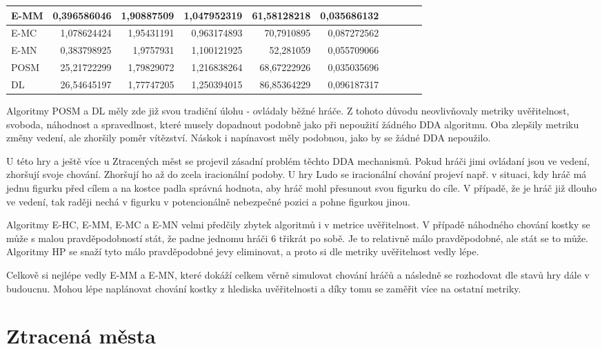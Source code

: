 \begin{table*}[b]
\begin{center}
\begin{tabular}{| l || r | r | r | r | r | r | r | r | r |}
E-MM & 0,396586046 & 1,90887509 & 1,047952319 & 61,58128218 & 0,035686132 \\ \hline  
E-MC & 1,078624424 & 1,95431191 & 0,963174893 & 70,7910895 & 0,087272562 \\ \hline  
E-MN & 0,383798925 & 1,9757931 & 1,100121925 & 52,281059 & 0,055709066 \\ \hline  
POSM & 25,21722299 & 1,79829072 & 1,216838264 & 68,67222926 & 0,035035696 \\ \hline  
DL & 26,54645197 & 1,77747205 & 1,250394015 & 86,85364229 & 0,096187317 \\ \hline  
\end{tabular}
\end{center}
\end{table*}

Algoritmy POSM a DL měly zde již svou tradiční úlohu - ovládaly běžné hráče. Z tohoto důvodu neovlivňovaly metriky uvěřitelnost, svoboda, náhodnost a spravedlnost, které musely dopadnout podobně jako při nepoužití žádného DDA algoritmu. Oba zlepšily metriku změny vedení, ale zhoršily poměr vítězství. Náskok i napínavost měly podobnou, jako by se žádné DDA nepoužilo. 

U této hry a ještě více u Ztracených měst se projevil zásadní problém těchto DDA mechanismů. Pokud hráči jimi ovládaní jsou ve vedení, zhoršují svoje chování. Zhoršují ho až do zcela iracionální podoby. U hry Ludo se iracionální chování projeví např. v situaci, kdy hráč má jednu figurku před cílem a na kostce padla správná hodnota, aby hráč mohl přesunout svou figurku do cíle. V případě, že je hráč již dlouho ve vedení, tak raději nechá v figurku v potencionálně nebezpečné pozici a pohne figurkou jinou. 

Algoritmy E-HC, E-MM, E-MC a E-MN velmi předčily zbytek algoritmů i v metrice uvěřitelnost. V případě náhodného chování kostky se může s malou pravděpodobností stát, že padne jednomu hráči 6 třikrát po sobě. Je to relativně málo pravděpodobné, ale stát se to může. Algoritmy HP se snaží tyto málo pravděpodobné jevy eliminovat, a proto si dle metriky uvěřitelnost vedly lépe.

Celkově si nejlépe vedly E-MM a E-MN, které dokáží celkem věrně simulovat chování hráčů a následně se rozhodovat dle stavů hry dále v budoucnu. Mohou lépe naplánovat chování kostky z hlediska uvěřitelnosti a díky tomu se zaměřit více na ostatní metriky.

\section{Ztracená města}

